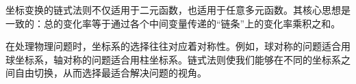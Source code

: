 \documentclass[12pt,UTF8,fontset=none]{ctexbook}
\begin{document}
坐标变换的链式法则不仅适用于二元函数，也适用于任意多元函数。其核心思想是一致的：总的变化率等于通过各个中间变量传递的“链条”上的变化率乘积之和。

在处理物理问题时，坐标系的选择往往对应着对称性。例如，球对称的问题适合用球坐标系，轴对称的问题适合用柱坐标系。链式法则使我们能够在不同的坐标系之间自由切换，从而选择最适合解决问题的视角。




\end{document}

